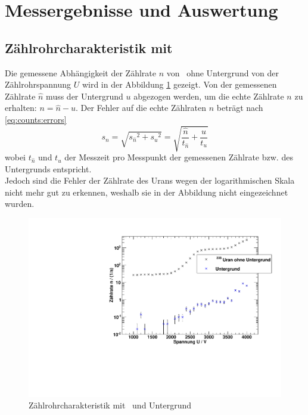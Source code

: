\section{Messergebnisse und Auswertung}

\subsection{Zählrohrcharakteristik mit \uran}
\label{sub:eval:uran}
Die gemessene Abhängigkeit der Zählrate $n$ von \uran\, ohne Untergrund von der Zählrohrspannung $U$ wird in der Abbildung \ref{img:char:uran} gezeigt.
Von der gemessenen Zählrate $\hat{n}$ muss der Untergrund $u$ abgezogen werden, um die echte Zählrate $n$ zu erhalten: $n = \hat{n}- u$. Der 
Fehler auf die echte Zählraten $n$ beträgt nach \autoref{eq:counts:errors}
\begin{equation}
  s_n=\sqrt{s_{\hat{n}}{}^2+s_u{}^2}=\sqrt{\frac{\hat{n}}{t_{\hat{n}}}+\frac{u}{t_u}}
\end{equation}
wobei $t_{\hat{n}}$ und $t_u$ der Messzeit pro Messpunkt der gemessenen Zählrate bzw. des Untergrunds entspricht. \\
Jedoch sind die Fehler der Zählrate des Urans wegen der logarithmischen Skala nicht mehr gut zu erkennen, weshalb sie in der Abbildung nicht 
eingezeichnet wurden.
\begin{figure}[H]
\begin{center}
  \includegraphics[width=15cm]{../img/Uran238_Charakteristik.pdf}
  \caption[Zählrohrcharakteristik mit \uran]{Zählrohrcharakteristik mit \uran\, und Untergrund}
  \label{img:char:uran}
\end{center}
\end{figure}
